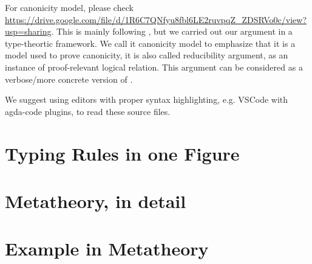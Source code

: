 For canonicity model, please check \\ \href{https://drive.google.com/file/d/1R6C7QNfyu8fbl6LE2ruvpqZ_ZDSRVo0c/view?usp=sharing}{https://drive.google.com/file/d/1R6C7QNfyu8fbl6LE2ruvpqZ_ZDSRVo0c/view?usp=sharing}. This is mainly following \citet{coquand2018canonicity,sterling2019algebraic}, but we carried out our argument in a type-theortic framework.  We call it canonicity model to emphasize that it is a model used to prove canonicity, it is also called reducibility argument, as an instance of proof-relevant logical relation. This argument can be considered as a verbose/more concrete version of \citet{kaposi2019gluing}.

We suggest using editors with proper syntax highlighting, e.g. VSCode with agda-code plugins, to read these source files.

\section{Typing Rules in one Figure}


\section{Metatheory, in detail}

\label{sec:metatheory}


\section{Example in Metatheory}\label{sec:coqexample}

